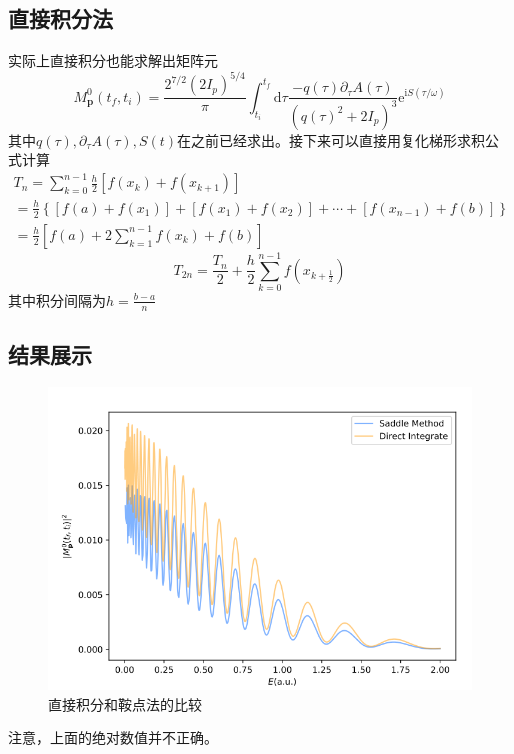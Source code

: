 \documentclass[a4paper]{ctexart}
\begin{document}
\subsection{直接积分法}
实际上直接积分也能求解出矩阵元
\begin{equation}
M_{\mathbf{p}}^{0}\left(t_{f}, t_{i}\right)=\frac{2^{7 / 2}\left(2 I_{p}\right)^{5 / 4}}{\pi} \int_{t_{i}}^{t_{f}} \mathrm{d} \tau \frac{-q(\tau) \partial_{\tau} A(\tau)}{\left(q(\tau)^{2}+2 I_{p}\right)^{3}} \mathrm{e}^{\mathrm{i} S(\tau / \omega)}
\end{equation}
其中$q(\tau), \partial_{\tau} A(\tau), S(t)$在之前已经求出。接下来可以直接用复化梯形求积公式计算
\begin{equation}
\begin{array}{l}{T_{n}=\sum_{k=0}^{n-1} \frac{h}{2}\left[f\left(x_{k}\right)+f\left(x_{k+1}\right)\right]} \\ {=\frac{h}{2}\left\{\left[f(a)+f\left(x_{1}\right)\right]+\left[f\left(x_{1}\right)+f\left(x_{2}\right)\right]+\cdots+\left[f\left(x_{n-1}\right)+f(b)\right]\right\}} \\ {=\frac{h}{2}\left[f(a)+2 \sum_{k=1}^{n-1} f\left(x_{k}\right)+f(b)\right]}\end{array}
\end{equation}
\begin{equation}
T_{2 n}=\frac{T_{n}}{2}+\frac{h}{2} \sum_{k=0}^{n-1} f\left(x_{k+\frac{1}{2}}\right)
\end{equation}
其中积分间隔为$h=\frac{b-a}{n}$

\subsection{结果展示}
\begin{figure}[hbt]
	\centering
	\includegraphics[width=12cm]{./fig/SPM_3.png}
	\caption{直接积分和鞍点法的比较}
\end{figure}
注意，上面的绝对数值并不正确。
\end{document}
